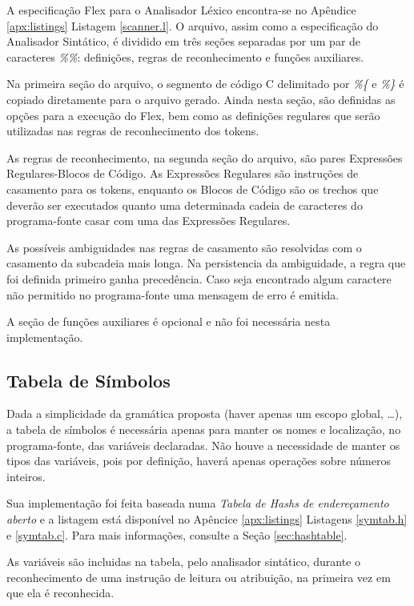 A especificação Flex para o Analisador Léxico encontra-se no Apêndice
\ref{apx:listings} Listagem \ref{scanner.l}. O arquivo, assim como a
especificação do Analisador Sintático, é dividido em três seções separadas
por um par de caracteres \emph{\%\%}: definições, regras de reconhecimento e
funções auxiliares.

Na primeira seção do arquivo, o segmento de código C delimitado por
\emph{\%\{} e \emph{\%\}} é copiado diretamente para o arquivo gerado. Ainda
nesta seção, são definidas as opções para a execução do Flex, bem como as
definições regulares que serão utilizadas nas regras de reconhecimento dos
tokens.

As regras de reconhecimento, na segunda seção do arquivo, são pares Expressões
Regulares-Blocos de Código. As Expressões Regulares são instruções de
casamento para os tokens, enquanto os Blocos de Código são os trechos que
deverão ser executados quanto uma determinada cadeia de caracteres do
programa-fonte casar com uma das Expressões Regulares.

As possíveis ambiguidades nas regras de casamento são resolvidas com o
casamento da subcadeia mais longa. Na persistencia da ambiguidade, a regra que
foi definida primeiro ganha precedência. Caso seja encontrado algum caractere
não permitido no programa-fonte uma mensagem de erro é emitida.

A seção de funções auxiliares é opcional e não foi necessária nesta
implementação.


\subsection{Tabela de Símbolos}
\label{sec:symtab}

Dada a simplicidade da gramática proposta (haver apenas um escopo global,
\dots), a tabela de símbolos é necessária apenas para manter os nomes e
localização, no programa-fonte, das variáveis declaradas. Não houve a
necessidade de manter os tipos das variáveis, pois por definição, haverá
apenas operações sobre números inteiros.

Sua implementação foi feita baseada numa \emph{Tabela de Hashs de
endereçamento aberto} e a listagem está disponível no Apêncice
\ref{apx:listings} Listagens \ref{symtab.h} e \ref{symtab.c}. Para
mais informações, consulte a Seção \ref{sec:hashtable}.

As variáveis são incluidas na tabela, pelo analisador sintático, durante o
reconhecimento de uma instrução de leitura ou atribuição, na primeira vez em
que ela é reconhecida.

